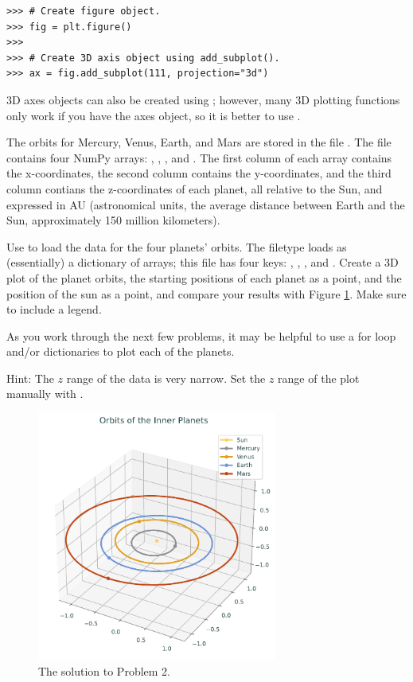 \begin{lstlisting}
>>> # Create figure object.
>>> fig = plt.figure()
>>>
>>> # Create 3D axis object using add_subplot().
>>> ax = fig.add_subplot(111, projection="3d")
\end{lstlisting}

3D axes objects can also be created using ; however, many 3D plotting functions only work if you have the axes object, so it is better to use .

\begin{problem}
The orbits for Mercury, Venus, Earth, and Mars are stored in the file .
The file contains four NumPy arrays: , , , and .
The first column of each array contains the x-coordinates, the second column contains the y-coordinates, and the third column contians the z-coordinates of each planet, all relative to the Sun, and expressed in AU (astronomical units, the average distance between Earth and the Sun, approximately 150 million kilometers).

Use  to load the data for the four planets' orbits.
The  filetype loads as (essentially) a dictionary of arrays; this file has four keys: , , , and .
Create a 3D plot of the planet orbits, the starting positions of each planet as a point, and the position of the sun as a point, and compare your results with Figure \ref{lab0:3dplot}.
Make sure to include a legend.

As you work through the next few problems, it may be helpful to use a for loop and/or dictionaries to plot each of the planets.

Hint: The $z$ range of the data is very narrow.
Set the $z$ range of the plot manually with .
\end{problem}

\begin{figure}[h]
\centering
\includegraphics[width=0.7\textwidth]{figures/orbits.pdf}
\caption{The solution to Problem 2.}
\label{lab0:3dplot}
\end{figure}

